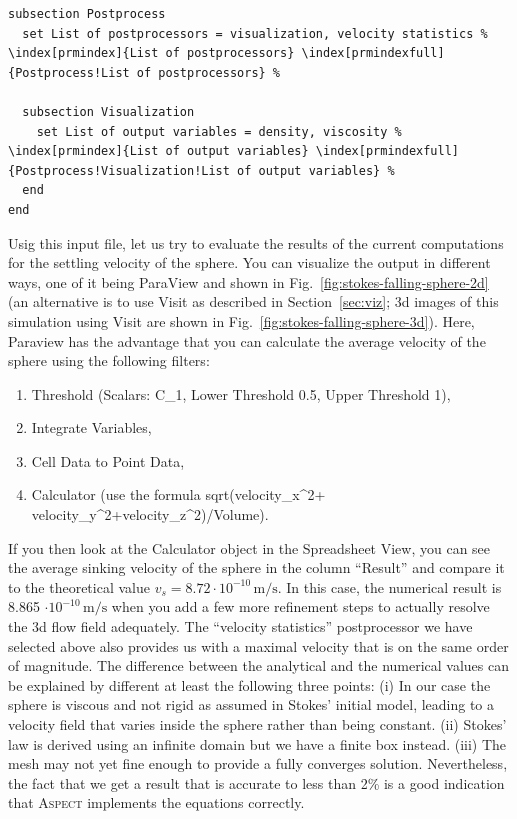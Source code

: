 \documentclass{article}
\newcommand{\aspect}{\textsc{Aspect}}
\begin{document}
\begin{lstlisting}[frame=single,language=prmfile,escapechar=\%]
subsection Postprocess
  set List of postprocessors = visualization, velocity statistics % \index[prmindex]{List of postprocessors} \index[prmindexfull]{Postprocess!List of postprocessors} %

  subsection Visualization
    set List of output variables = density, viscosity % \index[prmindex]{List of output variables} \index[prmindexfull]{Postprocess!Visualization!List of output variables} %
  end
end
\end{lstlisting}

Usig this input file, let us try to evaluate the results of the current
computations for the settling velocity of the sphere. You can visualize the output in different
ways, one of it being ParaView and shown in
Fig.~\ref{fig:stokes-falling-sphere-2d} (an alternative is to use Visit as
described in Section~\ref{sec:viz}; 3d images of this simulation using Visit
are shown in Fig.~\ref{fig:stokes-falling-sphere-3d}).
Here, Paraview has the advantage that you can calculate the average velocity
of the sphere using the following filters:
\begin{enumerate}
 \item Threshold (Scalars: C\_1, Lower Threshold 0.5, Upper Threshold 1),
 \item Integrate Variables,
 \item Cell Data to Point Data,
 \item Calculator (use the formula sqrt(velocity\_x\textasciicircum2+
       velocity\_y\textasciicircum2+velocity\_z\textasciicircum2)/Volume).
\end{enumerate}
If you then look at
the Calculator object in the Spreadsheet View, you can see the average sinking
velocity of the sphere in the column ``Result'' and compare it to the theoretical
value $v_s = 8.72 \cdot 10^{-10} \, \text{m}/\text{s}$.
In this case, the numerical result is 8.865 $\cdot 10^{-10} \,
\text{m}/\text{s}$ when you add a few more refinement steps to actually resolve
the 3d flow field adequately. The ``velocity statistics'' postprocessor we have
selected above also provides us with a maximal velocity that is on the same
order of magnitude. The difference between the analytical and the numerical
values can be explained by different at least the following three points:
(i) In our case the sphere is viscous and not rigid as assumed in Stokes' initial model, leading to
a velocity field that varies inside the sphere rather than being constant.
(ii) Stokes' law is derived using an infinite domain but we have a finite box
instead. (iii) The mesh may not yet fine enough to provide a fully converges
solution. Nevertheless, the fact that we get a result that is accurate to less
than 2\% is a good indication that \aspect{} implements the equations correctly.
\end{document}
